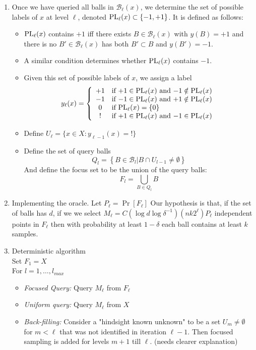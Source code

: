 \documentclass{article}
\def\B{{\mathcal B}}
\def\PL{{\rm PL}}
\begin{document}
\begin{enumerate}
\item Once we have queried all balls in $\B_{\ell}(x)$, we determine the set of possible labels of $x$ at level $\ell$, denoted $\PL_\ell(x) \subset \{-1,+1\}$. It is defined as follows:
\begin{itemize}
\item $\PL_\ell(x)$ contains $+1$ iff there exists $B \in \B_{\ell}(x)$ with $y(B) = +1$ and there is  no $B' \in \B_{ \ell}(x)$ has both $B' \subset B$ and $y(B') = -1$.
\item A similar condition determines whether $\PL_\ell(x)$ contains $-1$.
\item
Given this set of possible labels of $x$, we assign a label
$$ y_\ell(x)
=
\left\{
\begin{array}{cl}
+1 & \mbox{if $+1 \in \PL_\ell(x)$  and $-1 \notin \PL_\ell(x)$}\\
-1 & \mbox{if $-1 \in \PL_\ell(x)$  and $+1 \notin \PL_\ell(x)$}\\
0 & \mbox{if $\PL_\ell(x) = \{0\}$} \\
! & \mbox{if $+1 \in \PL_\ell(x)$  and $-1 \in \PL_\ell(x)$}
\end{array}
\right.
$$
\item Define $U_\ell = \{x \in X: y_{\ell-1}(x) = !\}$
\item Define the set of query balls 
$$Q_l= \left\{B \in \B_l  |   B \cap U_{l-1} \neq \emptyset \right\}$$
And define the focus set to be the union of the query balls:
$$F_l = \bigcup_{B \in Q_l} B$$
\end{itemize}

\item Implementing the oracle. Let $P_\ell = \Pr[F_\ell]$
Our hypothesis is that, if the set of balls has $d$, if we we select $M_\ell = C (\log d \log \delta^{-1})(n k 2^\ell) P_\ell$ independent points in $F_\ell$ then with probability at least $1-\delta$ each ball contains at least $k$ samples.

\item Deterministic algorithm\\
Set $F_1 = X$  \\
For $l=1,\ldots, l_{max}$
\begin{itemize}
\item {\em Focused Query:} Query $M_\ell$ from $F_\ell$
\item {\em Uniform query:} Query $M_\ell$ from $X$
\item {\em Back-filling:} Consider a "hindsight known unknown" to be a set 
$U_m \neq \emptyset$ for $m<\ell$ that was not identified in iteration $\ell-1$. Then focused sampling is added for levels $m+1$ till $\ell$. (needs clearer explanation)
\end{itemize}
\end{enumerate}
\end{document}
